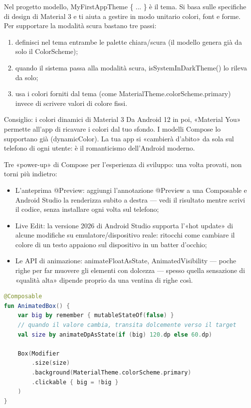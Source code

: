 Nel progetto modello, MyFirstAppTheme \{ ... \} è il tema. Si basa sulle specifiche di design di Material 3 e ti aiuta a gestire in modo unitario colori, font e forme. Per supportare la modalità scura bastano tre passi:

\begin{enumerate}
  \item definisci nel tema entrambe le palette chiara/scura (il modello genera già da solo il ColorScheme);
  \item quando il sistema passa alla modalità scura, isSystemInDarkTheme() lo rileva da solo;
  \item usa i colori forniti dal tema (come MaterialTheme.colorScheme.primary) invece di scrivere valori di colore fissi.
\end{enumerate}

\begin{tcbinfo}{Consiglio: i colori dinamici di Material 3}
Da Android 12 in poi, «Material You» permette all'app di ricavare i colori dal tuo sfondo. I modelli Compose lo supportano già (dynamicColor). La tua app si «cambierà d'abito» da sola sul telefono di ogni utente: è il romanticismo dell'Android moderno.

\end{tcbinfo}


Tre «power-up» di Compose per l'esperienza di sviluppo: una volta provati, non torni più indietro:

\begin{itemize}
  \item L'anteprima @Preview: aggiungi l'annotazione @Preview a una Composable e Android Studio la renderizza subito a destra — vedi il risultato mentre scrivi il codice, senza installare ogni volta sul telefono;
  \item Live Edit: la versione 2026 di Android Studio supporta l'«hot update» di alcune modifiche su emulatore/dispositivo reale: ritocchi come cambiare il colore di un testo appaiono sul dispositivo in un batter d'occhio;
  \item Le API di animazione: animateFloatAsState, AnimatedVisibility — poche righe per far muovere gli elementi con dolcezza — spesso quella sensazione di «qualità alta» dipende proprio da una ventina di righe così.
\end{itemize}

\begin{lstlisting}[language=Kotlin]
@Composable
fun AnimatedBox() {
    var big by remember { mutableStateOf(false) }
    // quando il valore cambia, transita dolcemente verso il target
    val size by animateDpAsState(if (big) 120.dp else 60.dp)

    Box(Modifier
        .size(size)
        .background(MaterialTheme.colorScheme.primary)
        .clickable { big = !big }
    )
}
\end{lstlisting}

